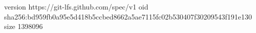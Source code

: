 version https://git-lfs.github.com/spec/v1
oid sha256:bd959fb0a95e5d418b5ccbed8662a5ae7115fc02b530407f30209543f191e130
size 1398096

